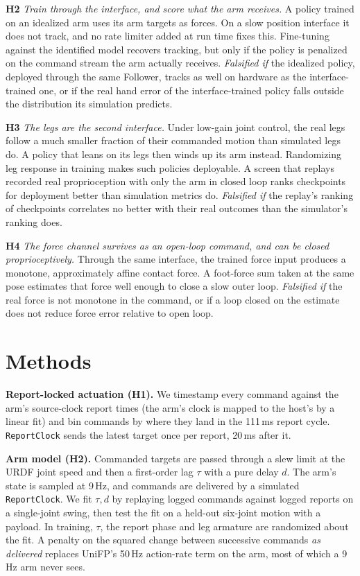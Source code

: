 \documentclass[conference]{IEEEtran}
\newcommand{\hyp}[1]{\textbf{H#1}}
\begin{document}
\hyp{2} \emph{Train through the interface, and score what the arm receives.} A policy trained on an idealized arm uses
its arm targets as forces. On a slow position interface it does not track, and no rate limiter added at run time
fixes this. Fine-tuning against the identified model recovers tracking, but only if the policy is penalized on the
command stream the arm actually receives. \emph{Falsified if} the idealized policy, deployed through the same
Follower, tracks as well on hardware as the interface-trained one, or if the real hand error of the interface-trained
policy falls outside the distribution its simulation predicts.

\hyp{3} \emph{The legs are the second interface.} Under low-gain joint control, the real legs follow a much smaller
fraction of their commanded motion than simulated legs do. A policy that leans on its legs then winds up its arm instead.
Randomizing leg response in training makes such policies deployable. A screen that replays recorded real
proprioception with only the arm in closed loop ranks checkpoints for deployment better than simulation metrics do.
\emph{Falsified if} the replay's ranking of checkpoints correlates no better with their real outcomes than the simulator's
ranking does.

\hyp{4} \emph{The force channel survives as an open-loop command, and can be closed proprioceptively.} Through the same
interface, the trained force input produces a monotone, approximately affine contact force. A foot-force sum taken at the
same pose estimates that force well enough to close a slow outer loop. \emph{Falsified if} the real force is not monotone
in the command, or if a loop closed on the estimate does not reduce force error relative to open loop.

\section{Methods}
\label{sec:method}

\textbf{Report-locked actuation (\hyp{1}).} We timestamp every command against the arm's source-clock report times
(the arm's clock is mapped to the host's by a linear fit) and bin commands by where they land in the 111\,ms report cycle.
\texttt{ReportClock} sends the latest target once per report, 20\,ms after it.

\textbf{Arm model (\hyp{2}).} Commanded targets are passed through a slew limit at the URDF joint speed and then a
first-order lag $\tau$ with a pure delay $d$. The arm's state is sampled at 9\,Hz, and commands are delivered by a
simulated \texttt{ReportClock}. We fit $\tau, d$ by replaying logged commands against logged reports on a single-joint
swing, then test the fit on a held-out six-joint motion with a payload. In training, $\tau$, the report phase and leg
armature are randomized about the fit. A penalty on the squared change between successive commands \emph{as delivered}
replaces UniFP's 50\,Hz action-rate term on the arm, most of which a 9\,Hz arm never sees.
\end{document}
